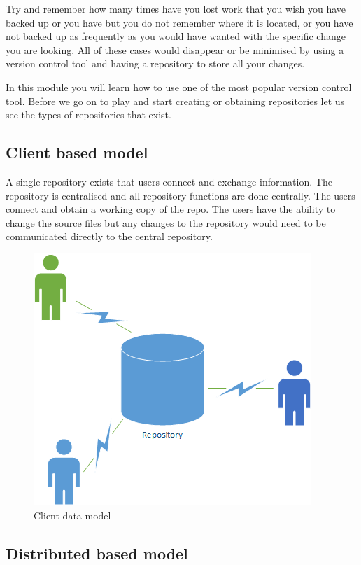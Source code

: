 \documentclass[
]{book}
\begin{document}
Try and remember how many times have you lost work that you wish you have backed up or you have but you do not remember where it is located, or you have not backed up as frequently as you would have wanted with the specific change you are looking. All of these cases would disappear or be minimised by using a version control tool and having a repository to store all your changes.

In this module you will learn how to use one of the most popular version control tool. Before we go on to play and start creating or obtaining repositories let us see the types of repositories that exist.

\hypertarget{client-based-model}{%
\subsection{Client based model}\label{client-based-model}}

A single repository exists that users connect and exchange information. The repository is centralised and all repository functions are done centrally. The users connect and obtain a working copy of the repo. The users have the ability to change the source files but any changes to the repository would need to be communicated directly to the central repository.

\begin{figure}

{\centering \includegraphics[width=0.6\linewidth]{images/Client Data Model Example} 

}

\caption{Client data model}\label{fig:unnamed-chunk-3}
\end{figure}

\hypertarget{distributed-based-model}{%
\subsection{Distributed based model}\label{distributed-based-model}}
\end{document}
